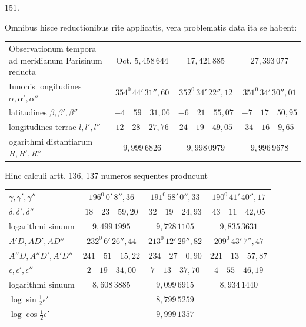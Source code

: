 \par{}\medskip
\hypertarget{native-202-article151}{}
\begin{center}151.\end{center}
Omnibus hisce reductionibus rite applicatis, vera problematis data ita se habent:
\begin{center}
\footnotesize\setlength{\tabcolsep}{3pt}\renewcommand{\arraystretch}{1.3}
\begin{tabular}{@{}p{12em}|c|c|c@{}}
{\raggedright Observationum tempora ad meridianum Parisinum reducta\par} & Oct. $5{,}458\,644$ & $17{,}421\,885$ & $27{,}393\,077$\\
{\raggedright Iunonis longitudines $\alpha,\alpha',\alpha''$\par} & $354^0\,44'\,31''{,}60$ & $352^0\,34'\,22''{,}12$ & $351^0\,34'\,30''{,}01$\\
{\raggedright latitudines $\beta,\beta',\beta''$\par} & $-4\quad59\quad31{,}06$ & $-6\quad21\quad55{,}07$ & $-7\quad17\quad50{,}95$\\
{\raggedright longitudines terrae $l,l',l''$\par} & $12\quad28\quad27{,}76$ & $24\quad19\quad49{,}05$ & $34\quad16\quad9{,}65$\\
{\raggedright ogarithmi distantiarum $R,R',R''$\par} & $9{,}999\,6826$ & $9{,}998\,0979$ & $9{,}996\,9678$\\
\end{tabular}
\end{center}

Hinc calculi artt. 136, 137 numeros sequentes producunt
\begin{center}
\footnotesize\setlength{\tabcolsep}{4pt}\renewcommand{\arraystretch}{1.3}
\begin{tabular}{@{}l|c|c|c@{}}
$\gamma,\gamma',\gamma''$ & $196^0\,0'\,8''{,}36$ & $191^0\,58'\,0''{,}33$ & $190^0\,41'\,40''{,}17$\\
$\delta,\delta',\delta''$ & $18\quad23\quad59{,}20$ & $32\quad19\quad24{,}93$ & $43\quad11\quad42{,}05$\\
logarithmi sinuum & $9{,}499\,1995$ & $9{,}728\,1105$ & $9{,}835\,3631$\\
$A'D,AD',AD''$ & $232^0\,6'\,26''{,}44$ & $213^0\,12'\,29''{,}82$ & $209^0\,43'\,7''{,}47$\\
$A''D,A''D',A'D''$ & $241\quad51\quad15{,}22$ & $234\quad27\quad0{,}90$ & $221\quad13\quad57{,}87$\\
$\epsilon,\epsilon',\epsilon''$ & $2\quad19\quad34{,}00$ & $7\quad13\quad37{,}70$ & $4\quad55\quad46{,}19$\\
logarithmi sinuum & $8{,}608\,3885$ & $9{,}099\,6915$ & $8{,}934\,1440$\\
$\log\sin\tfrac12\epsilon'$ & & $8{,}799\,5259$ & \\
$\log\cos\tfrac12\epsilon'$ & & $9{,}999\,1357$ & \\
\end{tabular}
\end{center}

